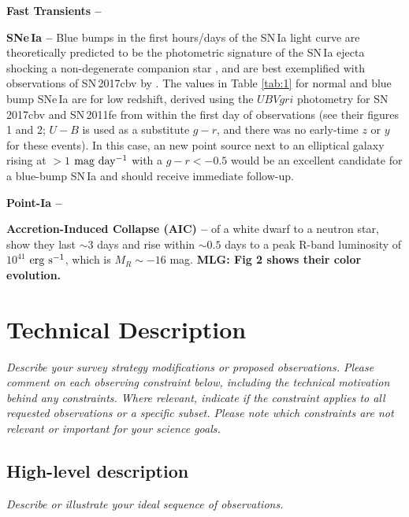 \documentclass[11pt]{article}
\begin{document}
{\bf Fast Transients -- }

{\bf SNe\,Ia --} Blue bumps in the first hours/days of the SN\,Ia light curve are theoretically predicted to be the photometric signature of the SN\,Ia ejecta shocking a non-degenerate companion star \citep{2010ApJ...708.1025K}, and are best exemplified with observations of SN\,2017cbv by \cite{2017ApJ...845L..11H}. The values in Table \ref{tab:1} for normal and blue bump SNe\,Ia are for low redshift, derived using the $UBVgri$ photometry for SN\,2017cbv and SN\,2011fe from \cite{2010ApJ...708.1025K} within the first day of observations (see their figures 1 and 2; $U-B$ is used as a substitute $g-r$, and there was no early-time $z$ or $y$ for these events). In this case, an new point source next to an elliptical galaxy rising at $>1$ $\rm mag\ day^{-1}$ with a $g-r < -0.5$ would be an excellent candidate for a blue-bump SN\,Ia and should receive immediate follow-up.

{\bf Point-Ia --} 

{\bf Accretion-Induced Collapse (AIC) --} of a white dwarf to a neutron star,  \cite{2010MNRAS.409..846D} show they last $\sim3$ days and rise within $\sim0.5$ days to a peak R-band luminosity of $10^{41}$ $\rm erg\ s^{-1}$, which is $M_R\sim -16$ mag. {\bf MLG: Fig 2 shows their color evolution.}



\clearpage
\section{Technical Description}
\begin{footnotesize}
{\it Describe your survey strategy modifications or proposed observations. Please comment on each observing constraint below, including the technical motivation behind any constraints. Where relevant, indicate if the constraint applies to all requested observations or a specific subset. Please note which constraints are not relevant or important for your science goals.}
\end{footnotesize}

\subsection{High-level description}
\begin{footnotesize}
{\it Describe or illustrate your ideal sequence of observations.}
\end{footnotesize}
\end{document}
